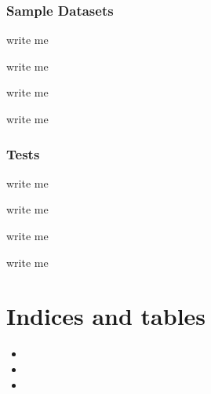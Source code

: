 \documentclass[letterpaper,10pt,english]{sphinxmanual}
\begin{document}
\subsection{Sample Datasets}
\label{\detokenize{Development Tools:sample-datasets}}
\begin{DUlineblock}{0em}
\item[] write me
\item[] write me
\item[] write me
\item[] write me
\end{DUlineblock}


\subsection{Tests}
\label{\detokenize{Development Tools:tests}}
\begin{DUlineblock}{0em}
\item[] write me
\item[] write me
\item[] write me
\item[] write me
\end{DUlineblock}


\chapter{Indices and tables}
\label{\detokenize{index:indices-and-tables}}\begin{itemize}
\item {} 
\sphinxAtStartPar
{}

\item {} 
\sphinxAtStartPar
{}

\item {} 
\sphinxAtStartPar
{}

\end{itemize}


\renewcommand{\indexname}{Python Module Index}
\begin{sphinxtheindex}
\let\bigletter\sphinxstyleindexlettergroup
\bigletter{c}
\item\relax{}
\end{sphinxtheindex}

\renewcommand{\indexname}{Index}
\printindex
\end{document}
